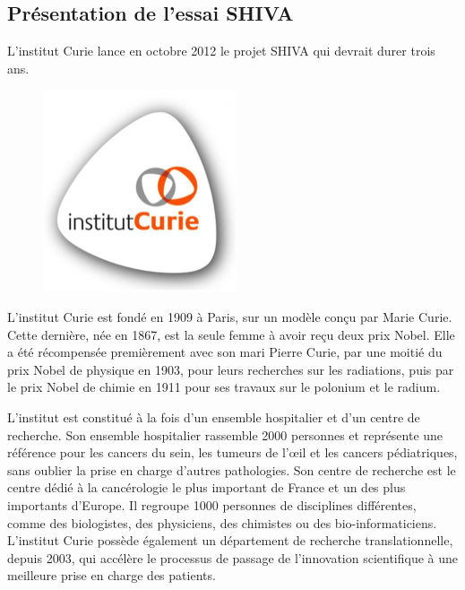 \documentclass[12pt, openany]{report}
\begin{document}
\subsection{Présentation de l’essai SHIVA}

L’institut Curie lance en octobre 2012 le projet SHIVA qui devrait durer trois ans. 

 \begin{figure}[H]
\begin{center}
    \includegraphics[scale=1]{Images/im18.png}
\end{center}
\end{figure}

L’institut Curie est fondé en 1909 à Paris, sur un modèle conçu par Marie Curie. 
Cette dernière, née en 1867, est la seule femme à avoir reçu deux prix Nobel. Elle a été récompensée premièrement avec son mari Pierre Curie, par une moitié du prix Nobel de physique en 1903, pour leurs recherches sur les radiations, puis par le prix Nobel de chimie en 1911 pour ses travaux sur le polonium et le radium. 

L’institut est constitué à la fois d’un ensemble hospitalier et d’un centre de recherche. Son ensemble hospitalier rassemble 2000 personnes et représente une référence pour les cancers du sein, les tumeurs de l’œil et les cancers pédiatriques, sans oublier la prise en charge d’autres pathologies. Son centre de recherche est le centre dédié à la cancérologie le plus important de France et un des plus importants d’Europe. Il regroupe 1000 personnes de disciplines différentes, comme des biologistes, des physiciens, des chimistes ou des bio-informaticiens. L’institut Curie possède également un département de recherche translationnelle, depuis 2003, qui accélère le processus de passage de l’innovation scientifique à une meilleure prise en charge des patients.
\end{document}
